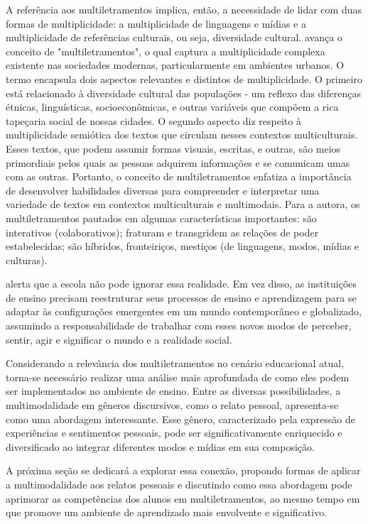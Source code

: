 \documentclass[portuguese]{textolivre}
\begin{document}
A referência aos multiletramentos implica, então, a necessidade de lidar com duas formas de multiplicidade: a multiplicidade de linguagens e mídias e a multiplicidade de referências culturais, ou seja, diversidade cultural. \textcite{rojo2012} avança o conceito de "multiletramentos", o qual captura a multiplicidade complexa existente nas sociedades modernas, particularmente em ambientes urbanos. O termo encapsula dois aspectos relevantes e distintos de multiplicidade. O primeiro está relacionado à diversidade cultural das populações - um reflexo das diferenças étnicas, linguísticas, socioeconômicas, e outras variáveis que compõem a rica tapeçaria social de nossas cidades. O segundo aspecto diz respeito à multiplicidade semiótica dos textos que circulam nesses contextos multiculturais. Esses textos, que podem assumir formas visuais, escritas, e outras, são meios primordiais pelos quais as pessoas adquirem informações e se comunicam umas com as outras. Portanto, o conceito de multiletramentos enfatiza a importância de desenvolver habilidades diversas para compreender e interpretar uma variedade de textos em contextos multiculturais e multimodais. Para a autora, os multiletramentos pautados em algumas características importantes: são interativos (colaborativos); fraturam e transgridem as relações de poder estabelecidas; são híbridos, fronteiriços, mestiços (de linguagens, modos, mídias e culturas).

\textcite{rojo2012} alerta que a escola não pode ignorar essa realidade. Em vez disso, as instituições de ensino precisam reestruturar seus processos de ensino e aprendizagem para se adaptar às configurações emergentes em um mundo contemporâneo e globalizado, assumindo a responsabilidade de trabalhar com esses novos modos de perceber, sentir, agir e significar o mundo e a realidade social.

Considerando a relevância dos multiletramentos no cenário educacional atual, torna-se necessário realizar uma análise mais aprofundada de como eles podem ser implementados no ambiente de ensino. Entre as diversas possibilidades, a multimodalidade em gêneros discursivos, como o relato pessoal, apresenta-se como uma abordagem interessante. Esse gênero, caracterizado pela expressão de experiências e sentimentos pessoais, pode ser significativamente enriquecido e diversificado ao integrar diferentes modos e mídias em sua composição.

A próxima seção se dedicará a explorar essa conexão, propondo formas de aplicar a multimodalidade aos relatos pessoais e discutindo como essa abordagem pode aprimorar as competências dos alunos em multiletramentos, ao mesmo tempo em que promove um ambiente de aprendizado mais envolvente e significativo.
\end{document}
